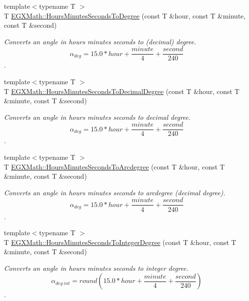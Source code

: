 \begin{DoxyCompactItemize}
{\footnotesize template$<$typename T $>$ }\\T \mbox{\hyperlink{group___e_g_x_math-_angle_conversions-_hours_minutes_seconds_ga4f66698550a0cf0fd326f25aba2c0d80}{E\+G\+X\+Math\+::\+Hours\+Minutes\+Seconds\+To\+Degree}} (const T \&hour, const T \&minute, const T \&second)
\begin{DoxyCompactList}\small\item\em Converts an angle in hours minutes seconds to (decimal) degree. \[\alpha_{deg}=15.0 * hour + \frac{minute}{4} + \frac{second}{240}\]. \end{DoxyCompactList}\item 
{\footnotesize template$<$typename T $>$ }\\T \mbox{\hyperlink{group___e_g_x_math-_angle_conversions-_hours_minutes_seconds_gad6662d1113ae8aea6baca6317888b4cd}{E\+G\+X\+Math\+::\+Hours\+Minutes\+Seconds\+To\+Decimal\+Degree}} (const T \&hour, const T \&minute, const T \&second)
\begin{DoxyCompactList}\small\item\em Converts an angle in hours minutes seconds to decimal degree. \[\alpha_{deg}=15.0 * hour + \frac{minute}{4} + \frac{second}{240}\]. \end{DoxyCompactList}\item 
{\footnotesize template$<$typename T $>$ }\\T \mbox{\hyperlink{group___e_g_x_math-_angle_conversions-_hours_minutes_seconds_ga3c38143df47da88534ddbd13726748e2}{E\+G\+X\+Math\+::\+Hours\+Minutes\+Seconds\+To\+Arcdegree}} (const T \&hour, const T \&minute, const T \&second)
\begin{DoxyCompactList}\small\item\em Converts an angle in hours minutes seconds to arcdegree (decimal degree). \[\alpha_{deg}=15.0 * hour + \frac{minute}{4} + \frac{second}{240}\]. \end{DoxyCompactList}\item 
{\footnotesize template$<$typename T $>$ }\\T \mbox{\hyperlink{group___e_g_x_math-_angle_conversions-_hours_minutes_seconds_gadf3829ca1704cfd64886a4de1b3e366f}{E\+G\+X\+Math\+::\+Hours\+Minutes\+Seconds\+To\+Integer\+Degree}} (const T \&hour, const T \&minute, const T \&second)
\begin{DoxyCompactList}\small\item\em Converts an angle in hours minutes seconds to integer degree. \[\alpha_{deg\ int}=round(15.0 * hour + \frac{minute}{4} + \frac{second}{240})\]. \end{DoxyCompactList}\item 

\end{DoxyCompactItemize}

